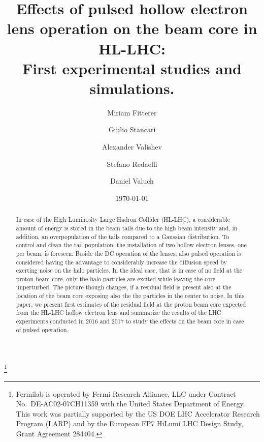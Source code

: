 \documentclass[%
 reprint,
 amsmath,amssymb,
 aps,
prstab,
]{revtex4-1}
\begin{document}
\title{Effects of pulsed hollow electron lens operation on the beam core in HL-LHC: \\First experimental studies and simulations.}%
\thanks{Fermilab is operated by Fermi Research Alliance, LLC under
	Contract No.~DE-AC02-07CH11359 with the United States Department of
	Energy. This work was partially supported by the US DOE LHC
	Accelerator Research Program (LARP) and by the European FP7 HiLumi
	LHC Design Study, Grant Agreement 284404.}

\author{Miriam Fitterer}
\author{Giulio Stancari}%
\author{Alexander Valishev}%
%

\author{Stefano Redaelli}
\author{Daniel Valuch}
%

\date{\today}%

\begin{abstract}
In case of the High Luminosity Large Hadron Collider (HL-LHC), a considerable amount of energy is stored in the beam tails due to the high beam intensity and, in addition, an overpopulation of the tails compared to a Gaussian distribution. To control and clean the tail population, the installation of two hollow electron lenses, one per beam, is foreseen. Beside the DC operation of the lenses, also pulsed operation is considered having the advantage to considerably increase the diffusion speed by exerting noise on the halo particles. In the ideal case, that is in case of no field at the proton beam core, only the halo particles are excited while leaving the core unperturbed. The picture though changes, if a residual field is present also at the location of the beam core exposing also the the particles in the center to noise. In this paper, we present first estimates of the residual field at the proton beam core expected from the HL-LHC hollow electron lens and summarize the results of the LHC experiments conducted in 2016 and 2017 to study the effects on the beam core in case of pulsed operation.
\end{abstract}


\maketitle
\end{document}
